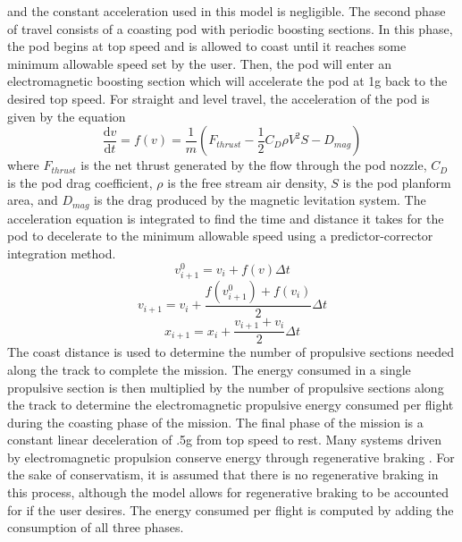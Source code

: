 	and the constant acceleration used in this model is negligible.
	The second phase of travel consists of a coasting pod with periodic boosting sections.
	In this phase, the pod begins at top speed and is allowed to coast until it
	reaches some minimum allowable speed set by the user.
	Then, the pod will enter an electromagnetic boosting section which will
	accelerate the pod at 1g back to the desired top speed.
	For straight and level travel, the acceleration of the pod is given by the equation
	\begin{equation}
		\label{eq:acceleration}
		\frac{\mathrm{d} v}{\mathrm{d} t} = f ( v  ) = \frac{1}{m} ( F_{thrust} - \frac{1}{2}C_{D}\rho V^{2}S - D_{mag})
	\end{equation}
	where $F_{thrust}$ is the net thrust generated by the flow through the pod
	nozzle, $C_D$ is the pod drag coefficient, $\rho$ is the free stream air
	density, $S$ is the pod planform area, and $D_{mag}$ is the drag produced
	by the magnetic levitation system. The acceleration equation is integrated
	to find the time and distance it takes for the pod to decelerate to the
	minimum allowable speed using a predictor-corrector integration method.
	\begin{equation}
		\label{eq:predictor_corrector}
		v_{i+1}^{0} = v_{i}+f(v)\Delta t
	\end{equation}
	\begin{equation}
		\label{eq:predictor_corrector_2}
		v_{i+1} = v_{i}+\frac{f(v_{i+1}^{0})+f(v_{i})}{2}\Delta t
	\end{equation}
	\begin{equation}
		\label{eq:predictor_corrector_3}
		x_{i+1} = x_{i}+\frac{v_{i+1}+v_{i}}{2}\Delta t
	\end{equation}
	The coast distance is used to determine the number of propulsive sections
	needed along the track to complete the mission. The energy consumed in a
	single propulsive section is then multiplied by the number of propulsive
	sections along the track to determine the electromagnetic propulsive energy
	consumed per flight during the coasting phase of the mission. The final
	phase of the mission is a constant linear deceleration of .5g from top
	speed to rest. Many systems driven by electromagnetic propulsion conserve
	energy through regenerative braking \cite{inductrack}. For the sake of
	conservatism, it is assumed that there is no regenerative braking in this
	process, although the model allows for regenerative braking to be
	accounted for if the user desires. The energy consumed per flight is
	computed by adding the consumption of all three phases.

